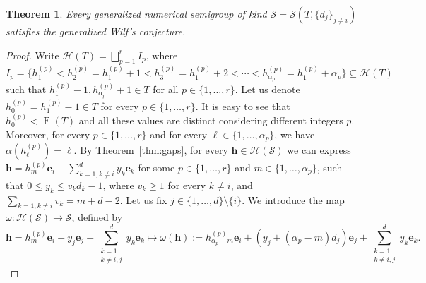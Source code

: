 \documentclass[12pt]{amsart}
\theoremstyle{plain}
\theoremstyle{theorem}
\newtheorem{theorem}[definition]{Theorem}
\theoremstyle{remark}
\begin{document}
\begin{theorem}\label{thm_wilf-gen}
Every generalized numerical semigroup of kind $\mathcal{S}=\mathcal{S}(T,\{d_j\}_{j\neq i})$ satisfies the generalized Wilf's conjecture.
\end{theorem}
\begin{proof}
Write $\mathcal{H}(T)=\bigsqcup_{p=1}^{r}I_p$, where 
$$I_p=\{h^{(p)}_1< h^{(p)}_2=h^{(p)}_1+1< h^{(p)}_3=h^{(p)}_1+2<\cdots < h^{(p)}_{\alpha_p}=h^{(p)}_1+\alpha_p\}\subseteq \mathcal{H}(T)$$ such that $h^{(p)}_1-1, h^{(p)}_{\alpha_p}+1\in T$ for all $p\in \{1,\ldots,r\}$. Let us denote $h^{(p)}_0=h^{(p)}_1-1\in T$ for every $p\in \{1,\ldots,r\}$. It is easy to see that $h^{(p)}_0<\operatorname{F}(T)$ and all these values are distinct considering different integers $p$. Moreover, for every $p\in \{1,\ldots, r\}$ and for every $\ell\in \{1,\ldots,\alpha_p\}$, we have $\alpha(h^{(p)}_\ell)=\ell$. By Theorem~\ref{thm:gaps}, for every $\mathbf{h}\in \mathcal{H}(\mathcal{S})$ we can express $\mathbf{h}=h_m^{(p)}\mathbf{e}_i+\sum_{k=1,k\neq i}^{d}y_k\mathbf{e}_k$ for some $p\in \{1,\ldots,r\}$ and $m\in \{1,\ldots,\alpha_p\}$, such that $0\leq y_k\leq v_kd_k-1$, where $v_k\geq 1$ for every $k\neq i$, and $\sum_{k=1,k\neq i}v_k=m+d-2$. Let us fix $j\in \{1,\ldots,d\}\setminus \{i\}$. We introduce the map $\omega:\mathcal{H}(\mathcal{S})\rightarrow \mathcal{S}$, defined by
$$\mathbf{h}=h_m^{(p)}\mathbf{e}_i+y_j\mathbf{e}_j+\sum_{\substack{k=1 \\ k\neq i,j}}^{d}y_k\mathbf{e}_k \longmapsto \omega(\mathbf{h}):=h_{\alpha_p-m}^{(p)}\mathbf{e}_i+(y_j+(\alpha_p-m)d_j)\mathbf{e}_j+\sum_{\substack{k=1 \\ k\neq i,j}}^{d}y_k\mathbf{e}_k.$$

\end{proof}
\end{document}
